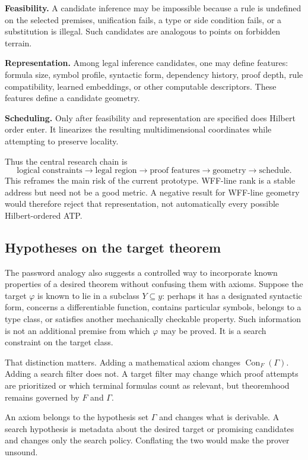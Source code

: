 \documentclass[11pt]{article}
\theoremstyle{hilberttheorem}
\begin{document}
\textbf{Feasibility.} A candidate inference may be impossible because a rule is undefined on the selected premises, unification fails, a type or side condition fails, or a substitution is illegal. Such candidates are analogous to points on forbidden terrain.

\textbf{Representation.} Among legal inference candidates, one may define features: formula size, symbol profile, syntactic form, dependency history, proof depth, rule compatibility, learned embeddings, or other computable descriptors. These features define a candidate geometry.

\textbf{Scheduling.} Only after feasibility and representation are specified does Hilbert order enter. It linearizes the resulting multidimensional coordinates while attempting to preserve locality.

Thus the central research chain is
\[
\text{logical constraints}\to\text{legal region}\to\text{proof features}\to\text{geometry}\to\text{schedule}.
\]
This reframes the main risk of the current prototype. WFF-line rank is a stable address but need not be a good metric. A negative result for WFF-line geometry would therefore reject that representation, not automatically every possible Hilbert-ordered ATP.

\subsection{Hypotheses on the target theorem}\label{subsec:target-hypotheses}
The password analogy also suggests a controlled way to incorporate known properties of a desired theorem without confusing them with axioms. Suppose the target $\varphi$ is known to lie in a subclass $Y\subseteq y$: perhaps it has a designated syntactic form, concerns a differentiable function, contains particular symbols, belongs to a type class, or satisfies another mechanically checkable property. Such information is not an additional premise from which $\varphi$ may be proved. It is a search constraint on the target class.

That distinction matters. Adding a mathematical axiom changes $\operatorname{Con}_F(\Gamma)$. Adding a search filter does not. A target filter may change which proof attempts are prioritized or which terminal formulas count as relevant, but theoremhood remains governed by $F$ and $\Gamma$.

\begin{tcolorbox}[colback=SoftGold,colframe=HilbertGold!80,arc=2mm,boxrule=.6pt,title={Axiom versus search hypothesis}]
An axiom belongs to the hypothesis set $\Gamma$ and changes what is derivable. A search hypothesis is metadata about the desired target or promising candidates and changes only the search policy. Conflating the two would make the prover unsound.
\end{tcolorbox}
\end{document}
